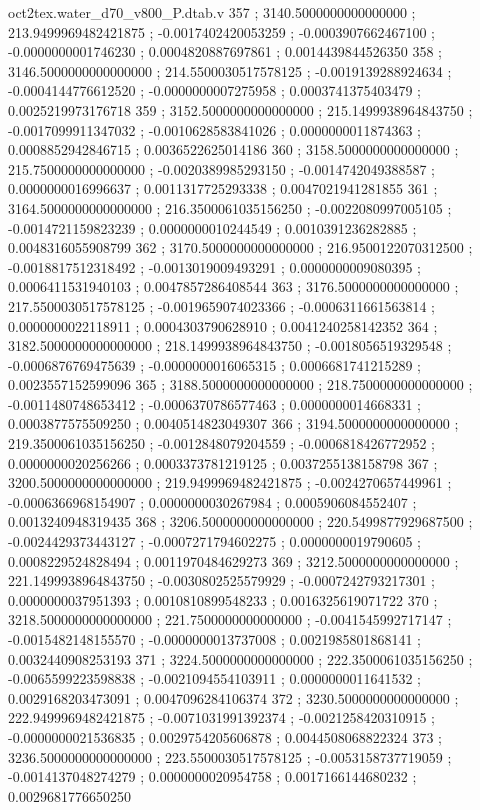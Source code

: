 \begin{filecontents}[overwrite]{oct2tex.water_d70_v800_P.dtab.v}
357 ; 3140.5000000000000000 ; 213.9499969482421875 ; -0.0017402420053259 ; -0.0003907662467100 ; -0.0000000001746230 ; 0.0004820887697861 ; 0.0014439844526350
358 ; 3146.5000000000000000 ; 214.5500030517578125 ; -0.0019139288924634 ; -0.0004144776612520 ; -0.0000000007275958 ; 0.0003741375403479 ; 0.0025219973176718
359 ; 3152.5000000000000000 ; 215.1499938964843750 ; -0.0017099911347032 ; -0.0010628583841026 ; 0.0000000011874363 ; 0.0008852942846715 ; 0.0036522625014186
360 ; 3158.5000000000000000 ; 215.7500000000000000 ; -0.0020389985293150 ; -0.0014742049388587 ; 0.0000000016996637 ; 0.0011317725293338 ; 0.0047021941281855
361 ; 3164.5000000000000000 ; 216.3500061035156250 ; -0.0022080997005105 ; -0.0014721159823239 ; 0.0000000010244549 ; 0.0010391236282885 ; 0.0048316055908799
362 ; 3170.5000000000000000 ; 216.9500122070312500 ; -0.0018817512318492 ; -0.0013019009493291 ; 0.0000000009080395 ; 0.0006411531940103 ; 0.0047857286408544
363 ; 3176.5000000000000000 ; 217.5500030517578125 ; -0.0019659074023366 ; -0.0006311661563814 ; 0.0000000022118911 ; 0.0004303790628910 ; 0.0041240258142352
364 ; 3182.5000000000000000 ; 218.1499938964843750 ; -0.0018056519329548 ; -0.0006876769475639 ; -0.0000000016065315 ; 0.0006681741215289 ; 0.0023557152599096
365 ; 3188.5000000000000000 ; 218.7500000000000000 ; -0.0011480748653412 ; -0.0006370786577463 ; 0.0000000014668331 ; 0.0003877575509250 ; 0.0040514823049307
366 ; 3194.5000000000000000 ; 219.3500061035156250 ; -0.0012848079204559 ; -0.0006818426772952 ; 0.0000000020256266 ; 0.0003373781219125 ; 0.0037255138158798
367 ; 3200.5000000000000000 ; 219.9499969482421875 ; -0.0024270657449961 ; -0.0006366968154907 ; 0.0000000030267984 ; 0.0005906084552407 ; 0.0013240948319435
368 ; 3206.5000000000000000 ; 220.5499877929687500 ; -0.0024429373443127 ; -0.0007271794602275 ; 0.0000000019790605 ; 0.0008229524828494 ; 0.0011970484629273
369 ; 3212.5000000000000000 ; 221.1499938964843750 ; -0.0030802525579929 ; -0.0007242793217301 ; 0.0000000037951393 ; 0.0010810899548233 ; 0.0016325619071722
370 ; 3218.5000000000000000 ; 221.7500000000000000 ; -0.0041545992717147 ; -0.0015482148155570 ; -0.0000000013737008 ; 0.0021985801868141 ; 0.0032440908253193
371 ; 3224.5000000000000000 ; 222.3500061035156250 ; -0.0065599223598838 ; -0.0021094554103911 ; 0.0000000011641532 ; 0.0029168203473091 ; 0.0047096284106374
372 ; 3230.5000000000000000 ; 222.9499969482421875 ; -0.0071031991392374 ; -0.0021258420310915 ; -0.0000000021536835 ; 0.0029754205606878 ; 0.0044508068822324
373 ; 3236.5000000000000000 ; 223.5500030517578125 ; -0.0053158737719059 ; -0.0014137048274279 ; 0.0000000020954758 ; 0.0017166144680232 ; 0.0029681776650250

\end{filecontents}
